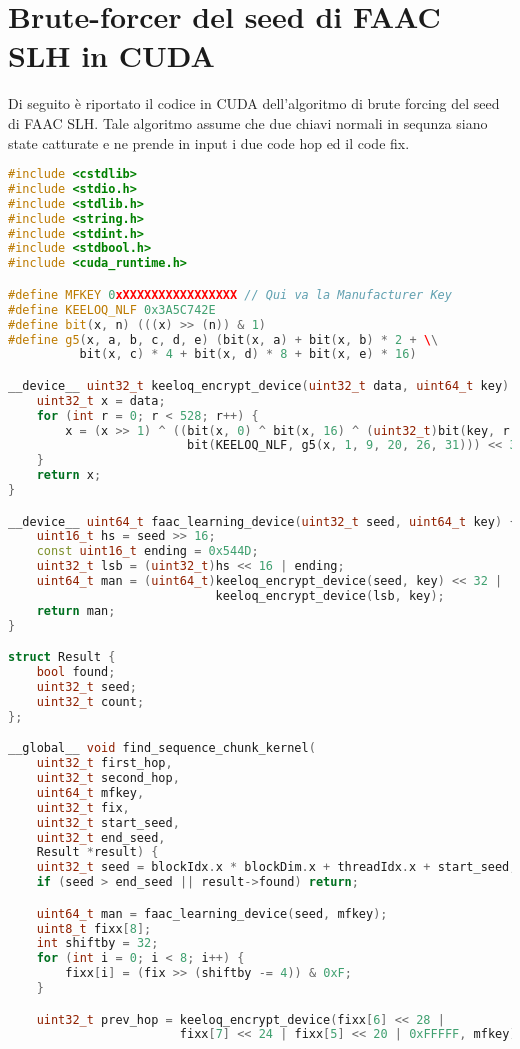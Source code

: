 \chapter{Brute-forcer del seed di FAAC SLH in CUDA}
\label{appendix:cuda}

Di seguito è riportato il codice in CUDA dell'algoritmo di brute forcing del seed di FAAC SLH. Tale algoritmo assume che due chiavi normali in sequnza siano state catturate e ne prende in input i due code hop ed il code fix.
\begin{lstlisting}[language=C++,basicstyle=\small,showstringspaces=false]
#include <cstdlib>
#include <stdio.h>
#include <stdlib.h>
#include <string.h>
#include <stdint.h>
#include <stdbool.h>
#include <cuda_runtime.h>

#define MFKEY 0xXXXXXXXXXXXXXXXX // Qui va la Manufacturer Key
#define KEELOQ_NLF 0x3A5C742E
#define bit(x, n) (((x) >> (n)) & 1)
#define g5(x, a, b, c, d, e) (bit(x, a) + bit(x, b) * 2 + \\
          bit(x, c) * 4 + bit(x, d) * 8 + bit(x, e) * 16)

__device__ uint32_t keeloq_encrypt_device(uint32_t data, uint64_t key) {
    uint32_t x = data;
    for (int r = 0; r < 528; r++) {
        x = (x >> 1) ^ ((bit(x, 0) ^ bit(x, 16) ^ (uint32_t)bit(key, r & 63) ^
                         bit(KEELOQ_NLF, g5(x, 1, 9, 20, 26, 31))) << 31);
    }
    return x;
}

__device__ uint64_t faac_learning_device(uint32_t seed, uint64_t key) {
    uint16_t hs = seed >> 16;
    const uint16_t ending = 0x544D;
    uint32_t lsb = (uint32_t)hs << 16 | ending;
    uint64_t man = (uint64_t)keeloq_encrypt_device(seed, key) << 32 |
                             keeloq_encrypt_device(lsb, key);
    return man;
}

struct Result {
    bool found;
    uint32_t seed;
    uint32_t count;
};

__global__ void find_sequence_chunk_kernel(
    uint32_t first_hop,
    uint32_t second_hop,
    uint64_t mfkey,
    uint32_t fix,
    uint32_t start_seed,
    uint32_t end_seed,
    Result *result) {
    uint32_t seed = blockIdx.x * blockDim.x + threadIdx.x + start_seed;
    if (seed > end_seed || result->found) return;

    uint64_t man = faac_learning_device(seed, mfkey);
    uint8_t fixx[8];
    int shiftby = 32;
    for (int i = 0; i < 8; i++) {
        fixx[i] = (fix >> (shiftby -= 4)) & 0xF;
    }

    uint32_t prev_hop = keeloq_encrypt_device(fixx[6] << 28 |
                        fixx[7] << 24 | fixx[5] << 20 | 0xFFFFF, mfkey);


\end{lstlisting}

